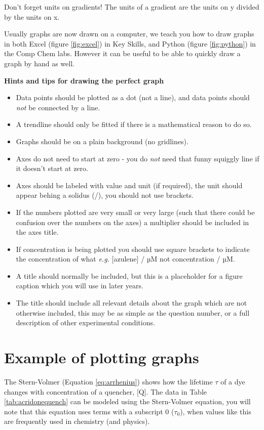 \documentclass[
]{book}
\providecommand{\tightlist}{%
  \setlength{\itemsep}{0pt}\setlength{\parskip}{0pt}}
\begin{document}
Don't forget units on gradients! The units of a gradient are the units on y divided by the units on x.

Usually graphs are now drawn on a computer, we teach you how to draw graphs in both Excel (figure \ref{fig:excel}) in Key Skills, and Python (figure \ref{fig:python}) in the Comp Chem labs. However it can be useful to be able to quickly draw a graph by hand as well.

\textbf{Hints and tips for drawing the perfect graph}

\begin{itemize}
\tightlist
\item
  Data points should be plotted as a dot (not a line), and data points should \emph{not} be connected by a line.
\item
  A trendline should only be fitted if there is a mathematical reason to do so.
\item
  Graphs should be on a plain background (no gridlines).
\item
  Axes do not need to start at zero - you do \emph{not} need that funny squiggly line if it doesn't start at zero.
\item
  Axes should be labeled with value and unit (if required), the unit should appear behing a solidus (/), you should not use brackets.
\item
  If the numbers plotted are very small or very large (such that there could be confusion over the numbers on the axes) a multiplier should be included in the axes title.
\item
  If concentration is being plotted you should use square brackets to indicate the concentration of what \emph{e.g.} {[}azulene{]} / µM not concentration / µM.
\item
  A title should normally be included, but this is a placeholder for a figure caption which you will use in later years.
\item
  The title should include all relevant details about the graph which are not otherwise included, this may be as simple as the question number, or a full description of other experimental conditions.
\end{itemize}

\hypertarget{subsec:example}{%
\section{Example of plotting graphs}\label{subsec:example}}

The Stern-Volmer (Equation \eqref{eq:arrhenius}) shows how the lifetime \(\tau\) of a dye changes with concentration of a quencher, {[}Q{]}. The data in Table \ref{tab:acridonequench} can be modeled using the Stern-Volmer equation, you will note that this equation uses terms with a subscript 0 (\(\tau_0\)), when values like this are frequently used in chemistry (and physics).
\end{document}
